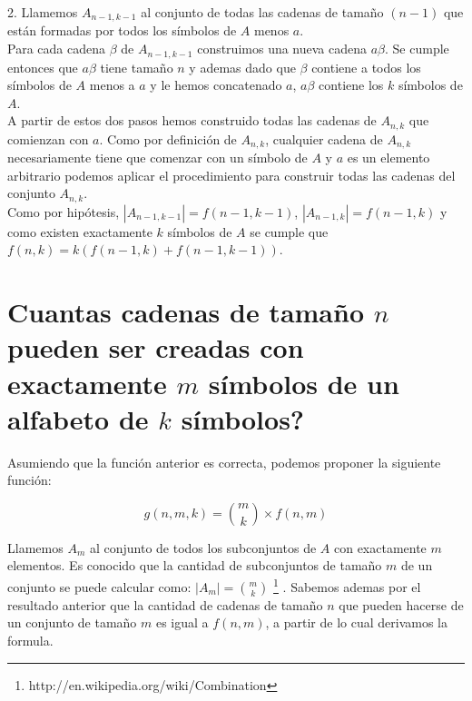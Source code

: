 \documentclass{amsart}
\begin{document}
2. Llamemos $A_{n-1, k-1}$ al conjunto de todas las cadenas de tamaño $(n-1)$ que están formadas por todos los símbolos de $A$ menos $a$.\\ 
Para cada cadena $\beta$ de $A_{n-1, k-1}$ construimos una nueva cadena $a\beta$. Se cumple entonces que $a\beta$ tiene tamaño $n$ y ademas dado que $\beta$ contiene a todos los símbolos de $A$ menos a $a$ y le hemos concatenado $a$, $a\beta$ contiene los $k$ símbolos de $A$.\\

A partir de estos dos pasos hemos construido todas las cadenas de $A_{n,k}$ que comienzan con $a$. Como por definición de $A_{n,k}$, cualquier cadena de $A_{n,k}$ necesariamente tiene que comenzar con un símbolo de $A$ y $a$ es un elemento arbitrario podemos aplicar el procedimiento para construir todas las cadenas del conjunto $A_{n,k}$.\\ 

Como por hipótesis, $|A_{n-1, k-1}| = f(n-1,k-1)$, $|A_{n-1, k}| = f(n-1,k)$ y como existen exactamente $k$ símbolos de $A$ se cumple que $f(n, k) = k( f(n-1,k) + f(n-1, k-1) )$.\\


\section{ Cuantas cadenas de tamaño $n$ pueden ser creadas con exactamente $m$ símbolos de un alfabeto de $k$ símbolos? }

Asumiendo que la función anterior es correcta, podemos proponer la siguiente función: 

\[ 
g(n,m,k) = \binom {m}{k} \times f(n,m)
\]


Llamemos $A_{m}$ al conjunto de todos los subconjuntos de $A$ con exactamente $m$ elementos. Es conocido que la cantidad de subconjuntos de tamaño $m$ de un conjunto se puede calcular como: $|A_{m}| = \binom {m}{k}$ \footnote{ http://en.wikipedia.org/wiki/Combination } . Sabemos ademas por el resultado anterior que la cantidad de cadenas de tamaño $n$ que pueden hacerse de un conjunto de tamaño $m$ es igual a $f(n,m)$, a partir de lo cual derivamos la formula.\\
\end{document}
